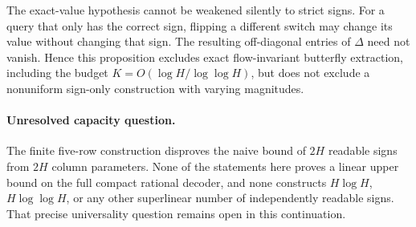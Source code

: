 \documentclass[11pt]{article}
\begin{document}
The exact-value hypothesis cannot be weakened silently to strict signs.
For a query that only has the correct sign, flipping a different
switch may change its value without changing that sign. The resulting
off-diagonal entries of $\Delta$ need not vanish. Hence this
proposition excludes exact flow-invariant butterfly extraction, including
the budget $K=O(\log H/\log\log H)$, but does not exclude a nonuniform
sign-only construction with varying magnitudes.

\paragraph{Unresolved capacity question.}
The finite five-row construction disproves the naive bound of $2H$
readable signs from $2H$ column parameters. None of the statements here
proves a linear upper bound on the full compact rational decoder, and
none constructs $H\log H$, $H\log\log H$, or any other superlinear
number of independently readable signs. That precise universality
question remains open in this continuation.
\end{document}

